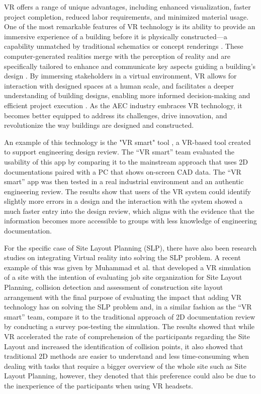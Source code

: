 VR offers a range of unique advantages, including enhanced visualization, faster project completion, reduced labor requirements, and minimized material usage. One of the most remarkable features of VR technology is its ability to provide an immersive experience of a building before it is physically constructed—a capability unmatched by traditional schematics or concept renderings \cite{Moonhubwebsite}. These computer-generated realities merge with the perception of reality and are specifically tailored to enhance and communicate key aspects guiding a building's design \cite{Schnabel2009}\cite{wang-2009}. By immersing stakeholders in a virtual environment, VR allows for interaction with designed spaces at a human scale, and facilitates a deeper understanding of building designs, enabling more informed decision-making and efficient project execution \cite{Castronovo2013}. As the AEC industry embraces VR technology, it becomes better equipped to address its challenges, drive innovation, and revolutionize the way buildings are designed and constructed. 
    
An example of this technology is the "VR smart" tool \cite{Wolfartsberger2019}, a VR-based tool created to support engineering design review. The “VR smart” team evaluated the usability of this app by comparing it to the mainstream approach that uses 2D documentations paired with a PC that shows on-screen CAD data. The “VR smart” app was then tested in a real industrial environment and an authentic engineering review. The results show that users of the VR system could identify slightly more errors in a design and the interaction with the system showed a much faster entry into the design review, which aligns with the evidence that the information becomes more accessible to groups with less knowledge of engineering documentation. 

For the specific case of Site Layout Planning (SLP), there have also been research studies on integrating Virtual reality into solving the SLP problem. A recent example of this was given by  Muhammad et al. \cite{Muhammad2020} that developed a VR simulation of a site with the intention of evaluating job site organization for Site Layout Planning, collision detection and assessment of construction site layout arrangement with the final purpose of evaluating the impact that adding VR technology has on solving the SLP problem and, in a similar fashion as the “VR smart” team, compare it to the traditional approach of 2D documentation review by conducting a survey pos-testing the simulation. The results showed that while VR accelerated the rate of comprehension of the participants regarding the Site Layout and increased the identification of collision points, it also showed that traditional 2D methods are easier to understand and less time-consuming when dealing with tasks that require a bigger overview of the whole site such as Site Layout Planning, however, they denoted that this preference could also be due to the inexperience of the participants when using VR headsets.

